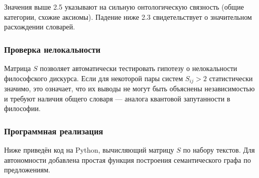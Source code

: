 \documentclass[12pt,a4paper]{article}
\begin{document}
	Значения выше 2.5 указывают на сильную онтологическую связность (общие категории, схожие аксиомы). Падение ниже 2.3 свидетельствует о значительном расхождении словарей.
	
	\subsubsection{Проверка нелокальности}
	
	Матрица \(S\) позволяет автоматически тестировать гипотезу о нелокальности философского дискурса. Если для некоторой пары систем \(S_{ij} > 2\) статистически значимо, это означает, что их выводы не могут быть объяснены независимостью и требуют наличия общего словаря — аналога квантовой запутанности в философии.
	
	\subsubsection{Программная реализация}
	
	Ниже приведён код на Python, вычисляющий матрицу \(S\) по набору текстов. Для автономности добавлена простая функция построения семантического графа по предложениям.
	
\end{document}

